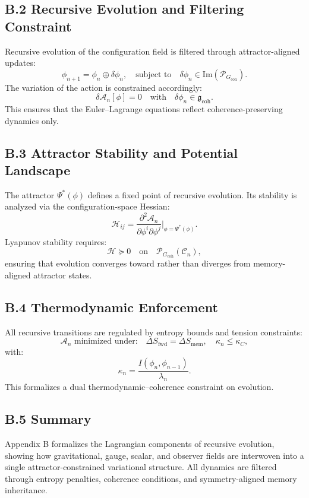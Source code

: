 \subsection*{B.2 Recursive Evolution and Filtering Constraint}

Recursive evolution of the configuration field is filtered through attractor-aligned updates:
\[
\phi_{n+1} = \phi_n \oplus \delta \phi_n,
\quad \text{subject to} \quad \delta \phi_n \in \text{Im}(\mathcal{P}_{G_{\text{coh}}}).
\]
The variation of the action is constrained accordingly:
\[
\delta \mathcal{A}_n[\phi] = 0 \quad \text{with} \quad \delta \phi_n \in \mathfrak{g}_{\text{coh}}.
\]
This ensures that the Euler–Lagrange equations reflect coherence-preserving dynamics only.

\subsection*{B.3 Attractor Stability and Potential Landscape}

The attractor \( \Psi^*(\phi) \) defines a fixed point of recursive evolution. Its stability is analyzed via the configuration-space Hessian:
\[
\mathcal{H}_{ij} = \frac{\partial^2 \mathcal{A}_n}{\partial \phi^i \partial \phi^j} \Bigg|_{\phi = \Psi^*(\phi)}.
\]
Lyapunov stability requires:
\[
\mathcal{H} \succeq 0 \quad \text{on} \quad \mathcal{P}_{G_{\text{coh}}}(\mathcal{C}_n),
\]
ensuring that evolution converges toward rather than diverges from memory-aligned attractor states.

\subsection*{B.4 Thermodynamic Enforcement}

All recursive transitions are regulated by entropy bounds and tension constraints:
\[
\mathcal{A}_n \text{ minimized under:} \quad 
\Delta S_{\text{fwd}} = \Delta S_{\text{mem}}, 
\quad \kappa_n \leq \kappa_C,
\]
with:
\[
\kappa_n = \frac{I(\phi_n, \phi_{n-1})}{\lambda_n}.
\]
This formalizes a dual thermodynamic–coherence constraint on evolution.

\subsection*{B.5 Summary}

Appendix B formalizes the Lagrangian components of recursive evolution, showing how gravitational, gauge, scalar, and observer fields are interwoven into a single attractor-constrained variational structure. All dynamics are filtered through entropy penalties, coherence conditions, and symmetry-aligned memory inheritance.
